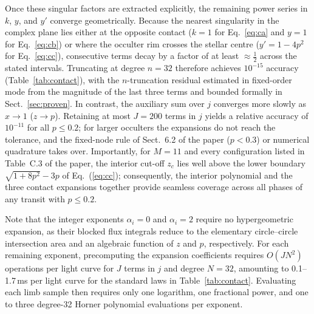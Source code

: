 \documentclass[11pt]{article}
\begin{document}
Once these singular factors are extracted explicitly, the remaining power series in $k$, $y$, and $y'$ converge geometrically. Because the nearest singularity in the complex plane lies either at the opposite contact ($k=1$ for Eq.~\ref{eq:ca} and $y=1$ for Eq.~\ref{eq:cb}) or where the occulter rim crosses the stellar centre ($y'=1-4p^2$ for Eq.~\ref{eq:cc}), consecutive terms decay by a factor of at least $\approx \tfrac12$ across the stated intervals. Truncating at degree $n=32$ therefore achieves $10^{-15}$ accuracy (Table~\ref{tab:contact}), with the $n$-truncation residual estimated in fixed-order mode from the magnitude of the last three terms and bounded formally in Sect.~\ref{sec:proven}. In contrast, the auxiliary sum over $j$ converges more slowly as $x\to 1$ ($z\to p$). Retaining at most $J=200$ terms in $j$ yields a relative accuracy of $10^{-11}$ for all $p\le0.2$; for larger occulters the expansions do not reach the tolerance, and the fixed-node rule of Sect.~6.2 of the paper ($p<0.3$) or numerical quadrature takes over. Importantly, for $M=11$ and every configuration listed in Table~C.3 of the paper, the interior cut-off $z_c$ lies well above the lower boundary $\sqrt{1+8p^2}-3p$ of Eq.~(\ref{eq:cc}); consequently, the interior polynomial and the three contact expansions together provide seamless coverage across all phases of any transit with $p\le0.2$.

Note that the integer exponents $\alpha_i=0$ and $\alpha_i=2$ require no hypergeometric expansion, as their blocked flux integrals reduce to the elementary circle--circle intersection area and an algebraic function of $z$ and $p$, respectively. For each remaining exponent, precomputing the expansion coefficients requires $O(JN^2)$ operations per light curve for $J$ terms in $j$ and degree $N=32$, amounting to 0.1--1.7\,ms per light curve for the standard laws in Table~\ref{tab:contact}. Evaluating each limb sample then requires only one logarithm, one fractional power, and one to three degree-32 Horner polynomial evaluations per exponent.
\end{document}
